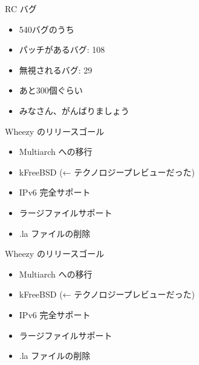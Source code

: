 \begin{frame}{RC バグ}

\begin{itemize}
  \item 540バグのうち\pause
  \item パッチがあるバグ: 108
  \item 無視されるバグ: 29
  \item あと300個ぐらい\pause
  \item みなさん、がんばりましょう
  
\end{itemize}


\end{frame}



\begin{frame}

\begin{center}
\end{center}

\end{frame}


\begin{frame}{Wheezy のリリースゴール}

\begin{itemize}
  \item Multiarch への移行
  \item kFreeBSD (← テクノロジープレビューだった)
  \item IPv6 完全サポート
  \item ラージファイルサポート
  \item .la ファイルの削除
\end{itemize}

\end{frame}



\begin{frame}{Wheezy のリリースゴール}

\begin{itemize}
  \item {\color{red}Multiarch への移行}
  \item kFreeBSD (← テクノロジープレビューだった)
  \item IPv6 完全サポート
  \item ラージファイルサポート
  \item .la ファイルの削除
\end{itemize}

\end{frame}



